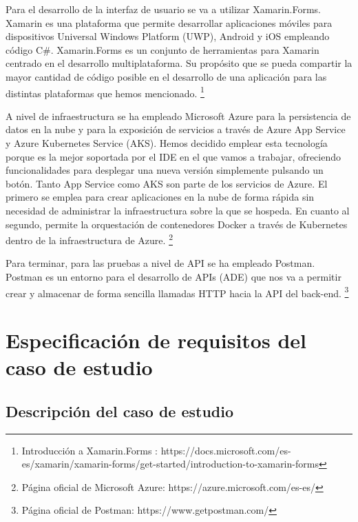 \documentclass[11pt,spanish,listoffigures]{tfgetsinf}
\begin{document}
Para el desarrollo de la interfaz de usuario se va a utilizar Xamarin.Forms. Xamarin es una plataforma que permite desarrollar aplicaciones móviles para dispositivos Universal Windows Platform (UWP), Android y iOS empleando código C\#. Xamarin.Forms es un conjunto de herramientas para Xamarin centrado en el desarrollo multiplataforma. Su propósito que se pueda compartir la mayor cantidad de código posible en el desarrollo de una aplicación para las distintas plataformas que hemos mencionado. \footnote{ Introducción a Xamarin.Forms
: https://docs.microsoft.com/es-es/xamarin/xamarin-forms/get-started/introduction-to-xamarin-forms}

A nivel de infraestructura se ha empleado Microsoft Azure para la persistencia de datos en la nube y para la exposición de servicios a través de Azure App Service y Azure Kubernetes Service (AKS). Hemos decidido emplear esta tecnología porque es la mejor soportada por el IDE en el que vamos a trabajar, ofreciendo funcionalidades para desplegar una nueva versión simplemente pulsando un botón. Tanto App Service como AKS son parte de los servicios de Azure. El primero se emplea para crear aplicaciones en la nube de forma rápida sin necesidad de administrar la infraestructura sobre la que se hospeda. En cuanto al segundo, permite la orquestación de contenedores Docker a través de Kubernetes dentro de la infraestructura de Azure. \footnote{ Página oficial de Microsoft Azure: https://azure.microsoft.com/es-es/}

Para terminar, para las pruebas a nivel de API se ha empleado Postman. Postman es un entorno para el desarrollo de APIs (ADE) que nos va a permitir crear y almacenar de forma sencilla llamadas HTTP hacia la API del back-end. \footnote{ Página oficial de Postman: https://www.getpostman.com/}


\chapter{Especificación de requisitos del caso de estudio}

\section{Descripción del caso de estudio}
\end{document}
